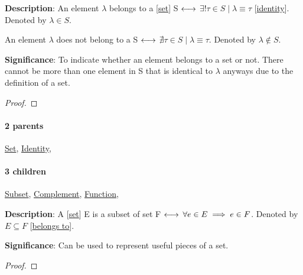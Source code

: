 \documentclass[../main.tex]{subfiles}
\begin{document}
\begin{statement}
\label{statement:Belongs To}\hspace*{0pt}\par
\end{statement}
\textbf{Description}:
An element $ \lambda $ belongs to a [\hyperref[statement:Set]{set}] S $ \longleftrightarrow $ $ \exists! \tau \in S \mid \lambda \equiv \tau $ [\hyperref[statement:Identity]{identity}].
Denoted by $ \lambda \in S $.

An element $ \lambda $ does not belong to a S $ \longleftrightarrow $ $ \nexists \tau \in S \mid \lambda \equiv \tau $.
Denoted by $ \lambda \notin S $.
\par
{\color{magenta} \textbf{Significance}:
To indicate whether an element belongs to a set or not.
There cannot be more than one element in S that is identical to $ \lambda $ anyways due to the definition of a set.
\par}
\begin{proof}
\proofbydefinition
\end{proof}\par
\paragraph{2 parents} \hyperref[statement:Set]{Set}, \hyperref[statement:Identity]{Identity}, 
\paragraph{3 children} \hyperref[statement:Subset]{Subset}, \hyperref[statement:Complement]{Complement}, \hyperref[statement:Function]{Function}, 



\begin{statement}
\label{statement:Subset}\hspace*{0pt}\par
\end{statement}
\textbf{Description}:
A [\hyperref[statement:Set]{set}] E is a subset of set F $ \longleftrightarrow $ $ \forall e \in E \implies e \in F $. Denoted by $ E \subseteq F $ [\hyperref[statement:Belongs To]{belongs to}].
\par
{\color{magenta} \textbf{Significance}:
Can be used to represent useful pieces of a set.
\par}
\begin{proof}
\proofbydefinition
\end{proof}\par
\end{document}
